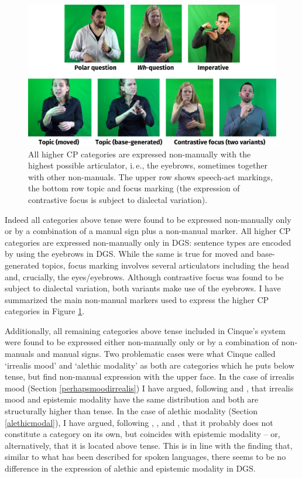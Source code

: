 \begin{figure}[bt]
\centering
	\includegraphics[width=1.0\textwidth]{uebersicht.jpg}
	\caption{All higher CP categories are expressed non-manually with the highest possible articulator, i.\,e., the eyebrows, sometimes together with other non-manuals. The upper row shows speech-act markings, the bottom row topic and focus marking (the expression of contrastive focus is subject to dialectal variation).}
	\label{highercpcategories}
\end{figure}

Indeed all categories above tense were found to be expressed non-manually only or by a combination of a manual sign plus a non-manual marker. All higher CP categories are expressed non-manually only in DGS: sentence types are encoded by using the eyebrows in DGS. While the same is true for moved and base-generated topics, focus marking involves several articulators including the head and, crucially, the eyes/eyebrows. Although contrastive focus was found to be subject to dialectal variation, both variants make use of the eyebrows. I have summarized the main non-manual markers used to express the higher CP categories in Figure \ref{highercpcategories}.

Additionally, all remaining categories above tense included in Cinque's system were found to be expressed either non-manually only or by a combination of non-manuals and manual signs. Two problematic cases were what Cinque called `irrealis mood' and `alethic modality' as both are categories which he puts below tense, but find non-manual expression with the upper face. In the case of irrealis mood (Section \ref{perhapsmoodirrealis}) I have argued, following \citet{nordstrom2010modality} and \citet{zyman2012two}, that irrealis mood and epistemic modality have the same distribution and both are structurally higher than tense. In the case of alethic modality (Section \ref{alethicmodal}), I have argued, following \citet{palmer1986mood}, \citet{nuyts2000epistemic}, and \citet{von2006modality}, that it probably does not constitute a category on its own, but coincides with epistemic modality -- or, alternatively, that it is located above tense. This is in line with the finding that, similar to what has been described for spoken languages, there seems to be no difference in the expression of alethic and epistemic modality in DGS.

